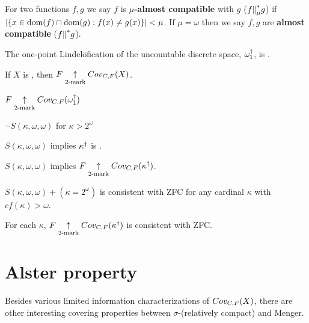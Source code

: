   \begin{defn}
    For two functions $f,g$ we say $f$ is \textbf{$\mu$-almost compatible} with $g$ ($f{\parallel}^*_\mu g$) if $|\{x\in\textrm{dom}(f)\cap\textrm{dom}(g):f(x)\not=g(x)\}|<\mu$. If $\mu=\omega$ then we say $f,g$ are \textbf{almost compatible} ($f{\parallel}^* g$).
  \end{defn}

  \begin{ex}
    The one-point Lindel\"ofication of the uncountable discrete space, $\omega_1^\dagger$, is \scish.
  \end{ex}

  \begin{thm}
    If $X$ is \scish, then $F \underset{2\text{-mark}}{\uparrow}Cov_{C,F}(X)$.
  \end{thm}

  \begin{cor}
    $F\underset{2\text{-mark}}{\uparrow}Cov_{C,F}(\omega_1^\dagger)$
  \end{cor}

  \begin{prop}
    $\neg S(\kappa,\omega,\omega)$ for $\kappa>2^\omega$
  \end{prop}

  \begin{thm}
    $S(\kappa,\omega,\omega)$ implies $\kappa^\dagger$ is \scish.
  \end{thm}

  \begin{cor}
    $S(\kappa,\omega,\omega)$ implies $F\underset{2\text{-mark}}{\uparrow}Cov_{C,F}(\kappa^\dagger)$.
  \end{cor}

  \begin{thm}
    $S(\kappa,\omega,\omega)+(\kappa=2^\omega)$ is consistent with ZFC for any cardinal $\kappa$ with $cf(\kappa)>\omega$.
  \end{thm}

  \begin{cor}
    For each $\kappa$, $F\underset{2\text{-mark}}{\uparrow}Cov_{C,F}(\kappa^\dagger)$ is consistent with ZFC.
  \end{cor}



  \section{Alster property}

  Besides various limited information characterizations of $Cov_{C,F}(X)$, there are other interesting covering properties between $\sigma$-(relatively compact) and Menger.

